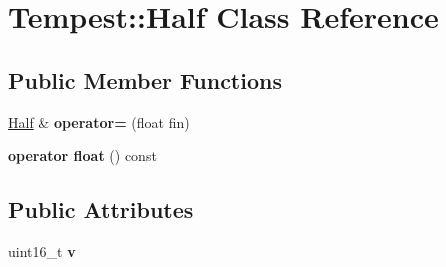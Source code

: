 \hypertarget{class_tempest_1_1_half}{\section{Tempest\+:\+:Half Class Reference}
\label{class_tempest_1_1_half}
}
\subsection*{Public Member Functions}
\begin{DoxyCompactItemize}
\item 
\hypertarget{class_tempest_1_1_half_a869653150ec9cf24a176dbb71a996ddc}{\hyperlink{class_tempest_1_1_half}{Half} \& {\bfseries operator=} (float fin)}\label{class_tempest_1_1_half_a869653150ec9cf24a176dbb71a996ddc}

\item 
\hypertarget{class_tempest_1_1_half_a523358e7b62072f0625cab16a91b511a}{{\bfseries operator float} () const }\label{class_tempest_1_1_half_a523358e7b62072f0625cab16a91b511a}

\end{DoxyCompactItemize}
\subsection*{Public Attributes}
\begin{DoxyCompactItemize}
\item 
\hypertarget{class_tempest_1_1_half_a050d462427f78f6f0b204922f44e9bb6}{uint16\+\_\+t {\bfseries v}}\label{class_tempest_1_1_half_a050d462427f78f6f0b204922f44e9bb6}

\end{DoxyCompactItemize}
